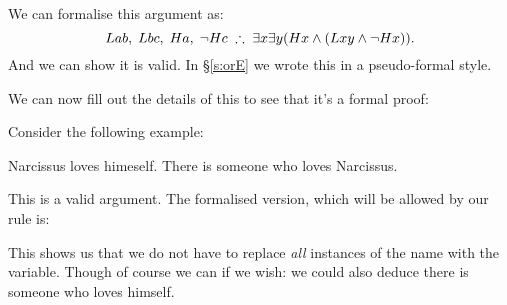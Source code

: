 We can formalise this argument as: $$Lab,\;Lbc,\;Ha,\;\enot Hc\;\therefore\;\exists x\exists y(Hx\eand (Lxy\eand\enot Hx)).$$ And we can show it is valid. In \S\ref{s:orE} we wrote this in a pseudo-formal style.
\begin{fitchproof}
	\LEM
	\open
	\close
	\open
	\close
\end{fitchproof}

We can now fill out the details of this to see that it's a formal proof:
\begin{fitchproof}
	\LEM
	\open
	\close
	\open
	\close
\end{fitchproof}

\bigskip
Consider the following example:
\begin{earg}
\prem Narcissus loves himeself.
\conc There is someone who loves Narcissus.
\end{earg}This is a valid argument. The formalised version, which will be allowed by our rule is:
\begin{fitchproof}
	 
\end{fitchproof} This shows us that we do not have to replace \emph{all} instances of the name with the variable. Though of course we can if we wish: we could also deduce there is someone who loves himself.


